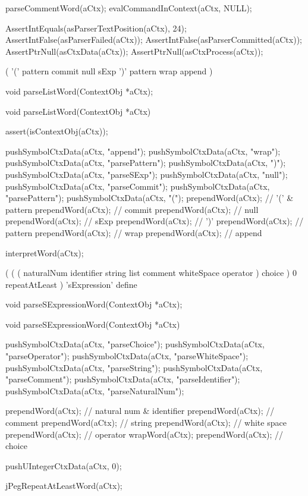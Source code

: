   parseCommentWord(aCtx);
  evalCommandInContext(aCtx, NULL);
  
  AssertIntEquals(asParserTextPosition(aCtx), 24);
  AssertIntFalse(asParserFailed(aCtx));
  AssertIntFalse(asParserCommitted(aCtx));
  AssertPtrNull(asCtxData(aCtx));
  AssertPtrNull(asCtxProcess(aCtx));
\stopCTest
\stopTestCase
\stopTestSuite

\startTestSuite[parseListWord]

\starttyping
(
  '(' pattern commit null
  sExp
  ')' pattern wrap append
)
\stoptyping

\startCHeader
void parseListWord(ContextObj *aCtx);
\stopCHeader

\startCCode
void parseListWord(ContextObj *aCtx) {
  assert(isContextObj(aCtx));
  
  pushSymbolCtxData(aCtx, "append");
  pushSymbolCtxData(aCtx, "wrap");
  pushSymbolCtxData(aCtx, "parsePattern");
  pushSymbolCtxData(aCtx, ")");
  pushSymbolCtxData(aCtx, "parseSExp");
  pushSymbolCtxData(aCtx, "null");
  pushSymbolCtxData(aCtx, "parseCommit");
  pushSymbolCtxData(aCtx, "parsePattern");
  pushSymbolCtxData(aCtx, "(");
  prependWord(aCtx); // '(' & pattern
  prependWord(aCtx); // commit
  prependWord(aCtx); // null
  prependWord(aCtx); // sExp
  prependWord(aCtx); // ')'
  prependWord(aCtx); // pattern
  prependWord(aCtx); // wrap
  prependWord(aCtx); // append
  
  interpretWord(aCtx);
}
\stopCCode

\stopTestSuite

\startTestSuite[parseSExpressionWord]

\starttyping
(
  (
    (
      naturalNum
      identifier
      string
      list
      comment
      whiteSpace
      operator
    ) choice
  ) 0 repeatAtLeast
) 'sExpression' define
\stoptyping

\startCHeader
void parseSExpressionWord(ContextObj *aCtx);
\stopCHeader

\startCCode
void parseSExpressionWord(ContextObj *aCtx) {

  pushSymbolCtxData(aCtx, "parseChoice");
  pushSymbolCtxData(aCtx, "parseOperator");
  pushSymbolCtxData(aCtx, "parseWhiteSpace");
  pushSymbolCtxData(aCtx, "parseString");
  pushSymbolCtxData(aCtx, "parseComment");
  pushSymbolCtxData(aCtx, "parseIdentifier");
  pushSymbolCtxData(aCtx, "parseNaturalNum");
  
  prependWord(aCtx); // natural num & identifier
  prependWord(aCtx); // comment
  prependWord(aCtx); // string
  prependWord(aCtx); // white space
  prependWord(aCtx); // operator
  wrapWord(aCtx);
  prependWord(aCtx); // choice

  pushUIntegerCtxData(aCtx, 0);

  jPegRepeatAtLeastWord(aCtx);
}
\stopCCode

